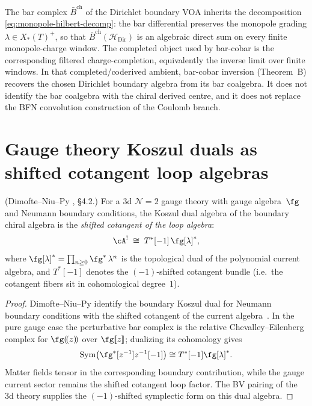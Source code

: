 \begin{remark}
\label{rem:bar-monopole}
The bar complex $\bar{B}^{\mathrm{ch}}$ of the Dirichlet boundary
VOA inherits the decomposition \eqref{eq:monopole-hilbert-decomp}:
the bar differential preserves the monopole grading
$\lambda \in X_*(T)^+$, so that
$\bar{B}^{\mathrm{ch}}(\mathcal{H}_{\mathrm{Dir}})$ is an algebraic
direct sum on every finite monopole-charge window. The completed
object used by bar-cobar is the corresponding filtered
charge-completion, equivalently the inverse limit over finite
windows. In that completed/coderived ambient, bar-cobar inversion
(Theorem~B) recovers the chosen Dirichlet boundary algebra from its
bar coalgebra. It does not identify the bar coalgebra with the
chiral derived centre, and it does not replace the BFN convolution
construction of the Coulomb branch.
\end{remark}


\section{Gauge theory Koszul duals as shifted cotangent loop algebras}
\label{sec:gauge-shifted-cotangent}

\begin{proposition}
\label{prop:gauge-koszul-dual-shifted-cotangent}
\textup{(Dimofte--Niu--Py \cite{DNP2025}, \S4.2.)}
For a 3d $\mathcal{N}=2$ gauge theory with gauge algebra~$\fg$ and
Neumann boundary conditions, the Koszul dual algebra of the boundary
chiral algebra is the \emph{shifted cotangent of the loop algebra}:
\begin{equation}\label{eq:gauge-koszul-shifted-cotangent}
 \cA^!
 \;\cong\;
 T^*[-1]\,\fg[\lambda]^*,
\end{equation}
where $\fg[\lambda]^* = \prod_{n \geq 0} \fg^*\,\lambda^n$ is the
topological dual of the polynomial current algebra, and $T^*[-1]$
denotes the $(-1)$-shifted cotangent bundle (i.e.\ the cotangent
fibers sit in cohomological degree~$1$).
\end{proposition}

\begin{proof}
Dimofte--Niu--Py identify the boundary Koszul dual for Neumann
boundary conditions with the shifted cotangent of the current
algebra~\cite[\S4.2]{DNP2025}. In the pure gauge case the perturbative
bar complex is the relative Chevalley--Eilenberg complex for
$\fg(\!(z)\!)$ over $\fg[\![z]\!]$; dualizing its cohomology gives
\[
\operatorname{Sym}\bigl(\fg^*[z^{-1}]z^{-1}[-1]\bigr)
\cong T^*[-1]\fg[\lambda]^* .
\]
Matter fields tensor in the corresponding boundary contribution, while
the gauge current sector remains the shifted cotangent loop factor. The
BV pairing of the 3d theory supplies the $(-1)$-shifted symplectic form
on this dual algebra.
\end{proof}

